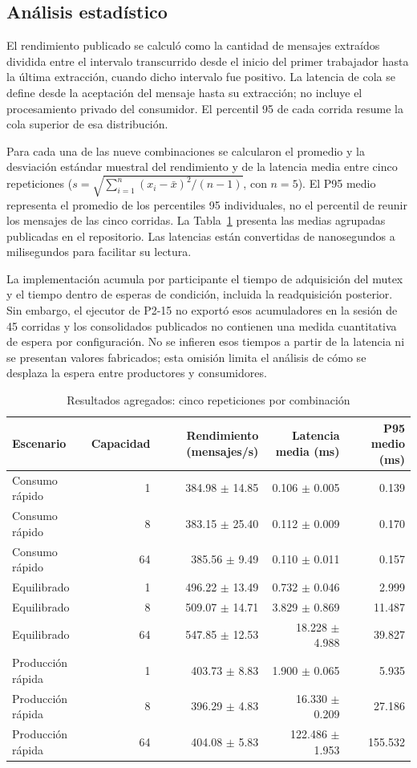 \documentclass[conference]{IEEEtran}
\begin{document}
\subsection{Análisis estadístico}
El rendimiento publicado se calculó como la cantidad de mensajes extraídos dividida entre el intervalo transcurrido desde el inicio del primer trabajador hasta la última extracción, cuando dicho intervalo fue positivo. La latencia de cola se define desde la aceptación del mensaje hasta su extracción; no incluye el procesamiento privado del consumidor. El percentil 95 de cada corrida resume la cola superior de esa distribución.

Para cada una de las nueve combinaciones se calcularon el promedio y la desviación estándar muestral del rendimiento y de la latencia media entre cinco repeticiones ($s=\sqrt{\sum_{i=1}^{n}(x_i-\bar{x})^2/(n-1)}$, con $n=5$). El P95 medio representa el promedio de los percentiles 95 individuales, no el percentil de reunir los mensajes de las cinco corridas. La Tabla~\ref{tab:resultados} presenta las medias agrupadas publicadas en el repositorio. Las latencias están convertidas de nanosegundos a milisegundos para facilitar su lectura.

La implementación acumula por participante el tiempo de adquisición del mutex y el tiempo dentro de esperas de condición, incluida la readquisición posterior. Sin embargo, el ejecutor de P2-15 no exportó esos acumuladores en la sesión de 45 corridas y los consolidados publicados no contienen una medida cuantitativa de espera por configuración. No se infieren esos tiempos a partir de la latencia ni se presentan valores fabricados; esta omisión limita el análisis de cómo se desplaza la espera entre productores y consumidores.

\begin{table}[htbp]
\caption{Resultados agregados: cinco repeticiones por combinación}\label{tab:resultados}
\centering\small
\begin{tabular}{lrrrr}
\toprule
Escenario & Capacidad & Rendimiento (mensajes/s) & Latencia media (ms) & P95 medio (ms) \\
\midrule
Consumo rápido & 1 & 384.98 $\pm$ 14.85 & 0.106 $\pm$ 0.005 & 0.139 \\
Consumo rápido & 8 & 383.15 $\pm$ 25.40 & 0.112 $\pm$ 0.009 & 0.170 \\
Consumo rápido & 64 & 385.56 $\pm$ 9.49 & 0.110 $\pm$ 0.011 & 0.157 \\
Equilibrado & 1 & 496.22 $\pm$ 13.49 & 0.732 $\pm$ 0.046 & 2.999 \\
Equilibrado & 8 & 509.07 $\pm$ 14.71 & 3.829 $\pm$ 0.869 & 11.487 \\
Equilibrado & 64 & 547.85 $\pm$ 12.53 & 18.228 $\pm$ 4.988 & 39.827 \\
Producción rápida & 1 & 403.73 $\pm$ 8.83 & 1.900 $\pm$ 0.065 & 5.935 \\
Producción rápida & 8 & 396.29 $\pm$ 4.83 & 16.330 $\pm$ 0.209 & 27.186 \\
Producción rápida & 64 & 404.08 $\pm$ 5.83 & 122.486 $\pm$ 1.953 & 155.532 \\
\bottomrule
\end{tabular}
\end{table}
\end{document}
